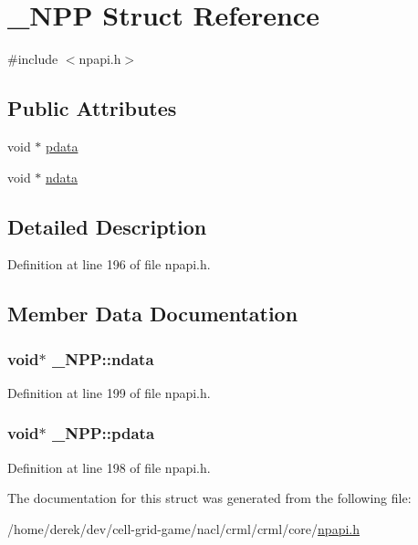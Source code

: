 \hypertarget{struct___n_p_p}{
\section{\_\-NPP Struct Reference}
\label{struct___n_p_p}
}


{\ttfamily \#include $<$npapi.h$>$}

\subsection*{Public Attributes}
\begin{DoxyCompactItemize}
\item 
void $\ast$ \hyperlink{struct___n_p_p_aaa6688d5b2a25be78d23122713ba9669}{pdata}
\item 
void $\ast$ \hyperlink{struct___n_p_p_a5a30fd63122dc07580ef5db2913feec8}{ndata}
\end{DoxyCompactItemize}


\subsection{Detailed Description}


Definition at line 196 of file npapi.h.



\subsection{Member Data Documentation}
\hypertarget{struct___n_p_p_a5a30fd63122dc07580ef5db2913feec8}{
\subsubsection[{ndata}]{\setlength{\rightskip}{0pt plus 5cm}void$\ast$ {\bf \_\-NPP::ndata}}}
\label{struct___n_p_p_a5a30fd63122dc07580ef5db2913feec8}


Definition at line 199 of file npapi.h.

\hypertarget{struct___n_p_p_aaa6688d5b2a25be78d23122713ba9669}{
\subsubsection[{pdata}]{\setlength{\rightskip}{0pt plus 5cm}void$\ast$ {\bf \_\-NPP::pdata}}}
\label{struct___n_p_p_aaa6688d5b2a25be78d23122713ba9669}


Definition at line 198 of file npapi.h.



The documentation for this struct was generated from the following file:\begin{DoxyCompactItemize}
\item 
/home/derek/dev/cell-\/grid-\/game/nacl/crml/crml/core/\hyperlink{npapi_8h}{npapi.h}\end{DoxyCompactItemize}
